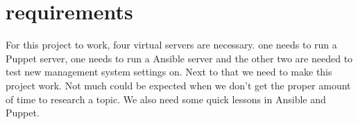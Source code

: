 \chapter{requirements}\label{requirements}
For this project to work, four virtual servers are necessary. one needs to run a Puppet server, one needs to run a Ansible server and the other two are needed to test new management system settings on.
Next to that we need to make this project work. Not much could be expected when we don't get the proper amount of time to research a topic. 
We also need some quick lessons in Ansible and Puppet. 
